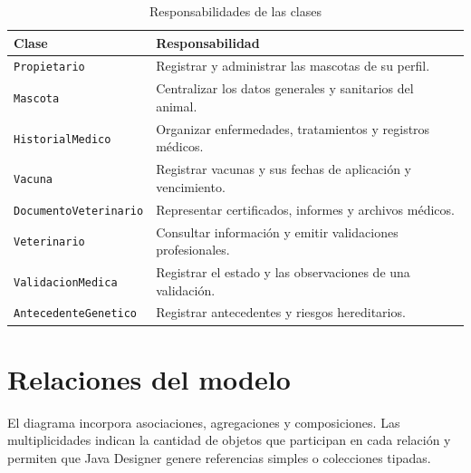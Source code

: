 \documentclass[10pt,a4paper,openany]{report}
\renewcommand{\arraystretch}{1.15}
\begin{document}
	\begin{table}[H]
		\centering
		\caption{Responsabilidades de las clases}
		\label{tab:responsabilidades-clases}
		\footnotesize
		\renewcommand{\arraystretch}{1.02}
		
		\begin{tabularx}{\textwidth}{|p{3.6cm}|Y|}
			\hline
			\textbf{Clase} & \textbf{Responsabilidad} \\
			\hline
			
			\texttt{Propietario} &
			Registrar y administrar las mascotas de su perfil. \\
			\hline
			
			\texttt{Mascota} &
			Centralizar los datos generales y sanitarios del animal. \\
			\hline
			
			\texttt{HistorialMedico} &
			Organizar enfermedades, tratamientos y registros médicos. \\
			\hline
			
			\texttt{Vacuna} &
			Registrar vacunas y sus fechas de aplicación y vencimiento. \\
			\hline
			
			\texttt{DocumentoVeterinario} &
			Representar certificados, informes y archivos médicos. \\
			\hline
			
			\texttt{Veterinario} &
			Consultar información y emitir validaciones profesionales. \\
			\hline
			
			\texttt{ValidacionMedica} &
			Registrar el estado y las observaciones de una validación. \\
			\hline
			
			\texttt{AntecedenteGenetico} &
			Registrar antecedentes y riesgos hereditarios. \\
			\hline
		\end{tabularx}
	\end{table}
	
	\section{Relaciones del modelo}
	
	El diagrama incorpora asociaciones, agregaciones y composiciones. Las
	multiplicidades indican la cantidad de objetos que participan en cada
	relación y permiten que Java Designer genere referencias simples o
	colecciones tipadas.
	
\end{document}
